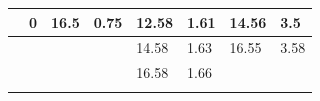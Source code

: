 \documentclass[10pt, a4j, dvipdfmx]{jarticle}
\begin{document}
\begin{table}[H]
\begin{tabular}{|l|l|l|l|l|l|l|l|}
                                      & 0              & 16.5                      & 0.75           & 12.58                     & 1.61            & 14.56                     & 3.5             \\ \hline
                                      &                &                           &                & 14.58                     & 1.63            & 16.55                     & 3.58            \\ \hline
                                      &                &                           &                & 16.58                     & 1.66            &                           &                 \\ \hline
                                      &                &                           &                &                           &                 &                           &                 \\ \hline
            \end{tabular}
        \normalsize
    \end{table}
\end{document}
